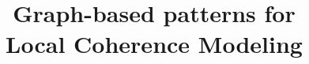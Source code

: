 \title{Graph-based patterns for \\ Local Coherence Modeling}

\publishers{{\normalsize vorgelegt von} \\ Mohsen Mesgar}
 
\date{} 

\titlehead{Inauguraldissertation zur Erlangung der Doktorwürde der Neuphilologischen Fakultät der Ruprecht-Karls-Universität Heidelberg} 

\lowertitleback{Referent: Prof.\ Dr.\ Michael Strube\\ Korreferent: Prof.\ Dr.\ Katja Markert\\ Einreichung: June 2018}



